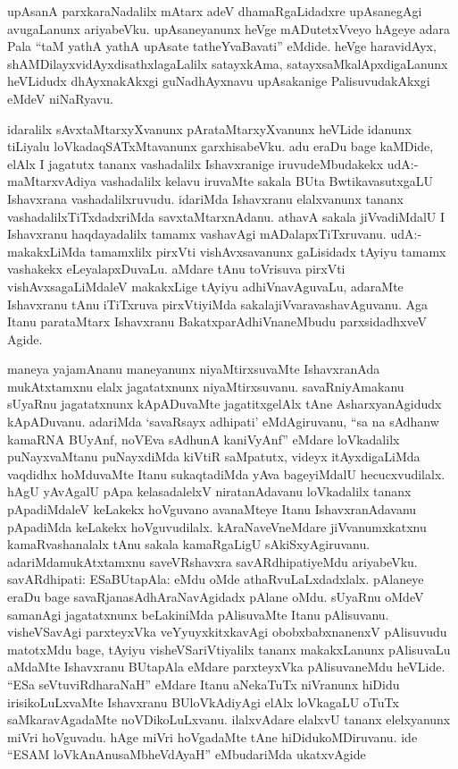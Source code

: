 \begin{artha}
upAsanA parxkaraNadalilx mAtarx adeV dhamaRgaLidadxre upAsanegAgi avugaLanunx ariyabeVku. upAsaneyanunx heVge mADutetxVveyo hAgeye adara Pala ``taM yathA yathA upAsate tatheYvaBavati'' eMdide. heVge haravidAyx, shAMDilayxvidAyxdisathxlagaLalilx satayxkAma, satayxsaMkalApxdigaLanunx heVLidudx dhAyxnakAkxgi guNadhAyxnavu upAsakanige PalisuvudakAkxgi eMdeV niNaRyavu.
\end{artha}


\begin{artha}
idaralilx sAvxtaMtarxyXvanunx pArataMtarxyXvanunx heVLide idanunx tiLiyalu loVkadaqSATxMtavanunx garxhisabeVku. adu eraDu bage kaMDide, elAlx I jagatutx tananx vashadalilx Ishavxranige iruvudeMbudakekx udA:- maMtarxvAdiya vashadalilx kelavu iruvaMte sakala BUta BwtikavasutxgaLU Ishavxrana vashadalilxruvudu. idariMda Ishavxranu elalxvanunx tananx vashadalilxTiTxdadxriMda savxtaMtarxnAdanu. athavA sakala jiVvadiMdalU  I Ishavxranu haqdayadalilx tamamx vashavAgi mADalapxTiTxruvanu. udA:- makakxLiMda tamamxlilx pirxVti vishAvxsavanunx gaLisidadx tAyiyu tamamx vashakekx eLeyalapxDuvaLu. aMdare tAnu toVrisuva pirxVti vishAvxsagaLiMdaleV makakxLige tAyiyu adhiVnavAguvaLu, adaraMte Ishavxranu tAnu iTiTxruva pirxVtiyiMda sakalajiVvaravashavAguvanu. Aga Itanu parataMtarx Ishavxranu BakatxparAdhiVnaneMbudu parxsidadhxveV Agide. 
\end{artha}


\begin{artha}
maneya yajamAnanu maneyanunx niyaMtirxsuvaMte IshavxranAda mukAtxtamxnu elalx jagatatxnunx niyaMtirxsuvanu. savaRniyAmakanu sUyaRnu jagatatxnunx kApADuvaMte jagatitxgelAlx tAne AsharxyanAgidudx kApADuvanu. adariMda `savaRsayx adhipati' eMdAgiruvanu, ``sa na sAdhanw kamaRNA BUyAnf, noVEva sAdhunA kaniVyAnf'' eMdare loVkadalilx puNayxvaMtanu puNayxdiMda kiVtiR saMpatutx, videyx itAyxdigaLiMda vaqdidhx hoMduvaMte Itanu sukaqtadiMda yAva bageyiMdalU hecucxvudilalx. hAgU yAvAgalU pApa kelasadalelxV niratanAdavanu loVkadalilx tananx pApadiMdaleV keLakekx hoVguvano avanaMteye Itanu IshavxranAdavanu pApadiMda keLakekx hoVguvudilalx. kAraNaveVneMdare jiVvanumxkatxnu kamaRvashanalalx tAnu sakala kamaRgaLigU sAkiSxyAgiruvanu. adariMdamukAtxtamxnu saveVRshavxra savARdhipatiyeMdu ariyabeVku. savARdhipati: ESaBUtapAla: eMdu oMde athaRvuLaLxdadxlalx. pAlaneye eraDu bage savaRjanasAdhAraNavAgidadx pAlane oMdu. sUyaRnu oMdeV samanAgi jagatatxnunx beLakiniMda pAlisuvaMte Itanu pAlisuvanu. visheVSavAgi parxteyxVka veYyuyxkitxkavAgi obobxbabxnanenxV  pAlisuvudu matotxMdu bage, tAyiyu visheVSariVtiyalilx tananx makakxLanunx pAlisuvaLu aMdaMte Ishavxranu BUtapAla eMdare parxteyxVka pAlisuvaneMdu heVLide. ``ESa seVtuviRdharaNaH'' eMdare Itanu aNekaTuTx niVranunx hiDidu irisikoLuLxvaMte Ishavxranu BUloVkAdiyAgi elAlx loVkagaLU oTuTx saMkaravAgadaMte noVDikoLuLxvanu. ilalxvAdare elalxvU tananx elelxyanunx miVri hoVguvadu. hAge miVri hoVgadaMte tAne hiDidukoMDiruvanu. ide ``ESAM loVkAnAnusaMbheVdAyaH'' eMbudariMda ukatxvAgide
\end{artha}

